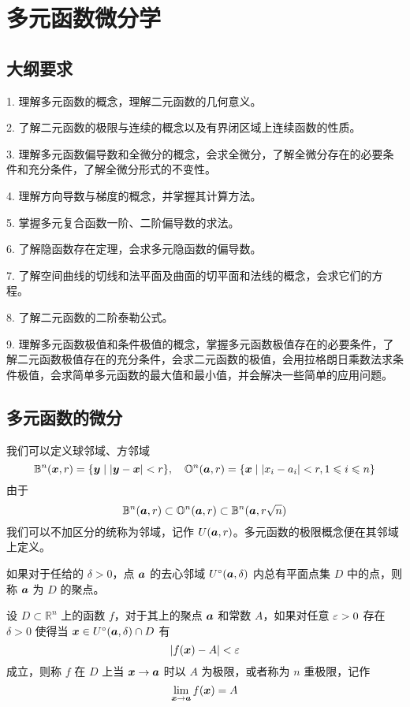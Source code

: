 \section{多元函数微分学}

\subsection{大纲要求}

1. 理解多元函数的概念，理解二元函数的几何意义。

2. 了解二元函数的极限与连续的概念以及有界闭区域上连续函数的性质。

3. 理解多元函数偏导数和全微分的概念，会求全微分，了解全微分存在的必要条件和充分条件，了解全微分形式的不变性。

4. 理解方向导数与梯度的概念，并掌握其计算方法。

5. 掌握多元复合函数一阶、二阶偏导数的求法。

6. 了解隐函数存在定理，会求多元隐函数的偏导数。

7. 了解空间曲线的切线和法平面及曲面的切平面和法线的概念，会求它们的方程。

8. 了解二元函数的二阶泰勒公式。

9. 理解多元函数极值和条件极值的概念，掌握多元函数极值存在的必要条件，了解二元函数极值存在的充分条件，会求二元函数的极值，会用拉格朗日乘数法求条件极值，会求简单多元函数的最大值和最小值，并会解决一些简单的应用问题。

\subsection{多元函数的微分}

我们可以定义球邻域、方邻域
\[ \mathbb{B}^n(\boldsymbol{x}, r) = \{ \boldsymbol{y} \mid |\boldsymbol{y}-\boldsymbol{x}| < r \}, \quad \mathbb{O}^n(\boldsymbol{a}, r) = \{ \boldsymbol{x} \mid |x_i - a_i| < r, 1 \leqslant i \leqslant n \} \]
由于
\[ \mathbb{B}^n(\boldsymbol{a}, r) \subset \mathbb{O}^n(\boldsymbol{a}, r) \subset \mathbb{B}^n(\boldsymbol{a}, r\sqrt{n})  \]
我们可以不加区分的统称为邻域，记作 $U(\boldsymbol{a}, r)$。多元函数的极限概念便在其邻域上定义。

如果对于任给的 $\delta > 0$，点 $\boldsymbol{a}$ 的去心邻域 $U^\circ(\boldsymbol{a}, \delta)$ 内总有平面点集 $D$ 中的点，则称 $\boldsymbol{a}$ 为 $D$ 的聚点。

\begin{definition}[多元函数的极限]
	设 $D \subset \mathbb{R}^n$ 上的函数 $f$，对于其上的聚点 $\boldsymbol{a}$ 和常数 $A$，如果对任意 $\varepsilon > 0$ 存在 $\delta > 0$ 使得当 $\boldsymbol{x} \in U^{\circ}(\boldsymbol{a}, \delta) \cap D$ 有
	\[ |f(\boldsymbol{x}) - A| < \varepsilon \]
	成立，则称 $f$ 在 $D$ 上当 $\boldsymbol{x} \to \boldsymbol{a}$ 时以 $A$ 为极限，或者称为 $n$ 重极限，记作
	\[ \lim_{\boldsymbol{x} \to \boldsymbol{a}} f(\boldsymbol{x}) = A \]
\end{definition}

